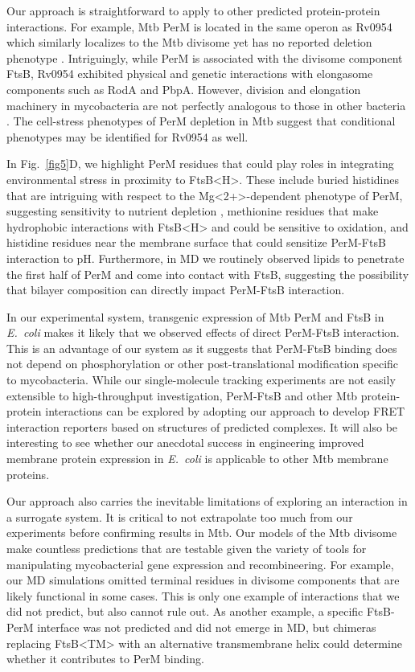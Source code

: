 \documentclass[twocolumn,pdflatex,sn-nature]{sn-jnl}%
\def\textsuperscript#1{<#1>}%
\newcommand\ec{\textit{E.~coli}}
\newcommand\mtb{Mtb}
\newcommand\ftsbTM{FtsB\textsuperscript{TM}}
\newcommand\ftsbH{FtsB\textsuperscript{H}}
\begin{document}
Our approach is straightforward to apply to other predicted protein-protein interactions.
For example, \mtb{} PerM is located in the same operon as Rv0954 which similarly localizes to the \mtb{} divisome yet has no reported deletion phenotype \citep{wangRv0954MemberMycobacterial2021a}.
Intriguingly, while PerM is associated with the divisome component FtsB, Rv0954 exhibited physical and genetic interactions with elongasome components such as RodA and PbpA.
However, division and elongation machinery in mycobacteria are not perfectly analogous to those in other bacteria \cite{baranowskiDreamMycobacterium2019}.
The cell-stress phenotypes of PerM depletion in \mtb{} suggest that conditional phenotypes may be identified for Rv0954 as well.

In Fig.~\ref{fig5}D, we highlight PerM residues that could play roles in integrating environmental stress in proximity to \ftsbH{}.
These include buried histidines that are intriguing with respect to the Mg\textsuperscript{2+}-dependent phenotype of PerM, suggesting sensitivity to nutrient depletion \citep{goodsmithDisruptionTuberculosisMembrane2015}, methionine residues that make hydrophobic interactions with \ftsbH{} and could be sensitive to oxidation, and histidine residues near the membrane surface that could sensitize PerM-FtsB interaction to pH.
Furthermore, in MD we routinely observed lipids to penetrate the first half of PerM and come into contact with FtsB, suggesting the possibility that bilayer composition can directly impact PerM-FtsB interaction.

In our experimental system, transgenic expression of \mtb{} PerM and FtsB in \ec{} makes it likely that we observed effects of direct PerM-FtsB interaction.
This is an advantage of our system as it suggests that PerM-FtsB binding does not depend on phosphorylation or other post-translational modification specific to mycobacteria.
While our single-molecule tracking experiments are not easily extensible to high-throughput investigation, PerM-FtsB and other \mtb{} protein-protein interactions can be explored by adopting our approach to develop FRET interaction reporters based on structures of predicted complexes.
It will also be interesting to see whether our anecdotal success in engineering improved membrane protein expression in \ec{} is applicable to other \mtb{} membrane proteins.

Our approach also carries the inevitable limitations of exploring an interaction in a surrogate system.
It is critical to not extrapolate too much from our experiments before confirming results in \mtb{}.
Our models of the \mtb{} divisome make countless predictions that are testable given the variety of tools for manipulating mycobacterial gene expression and recombineering.
For example, our MD simulations omitted terminal residues in divisome components that are likely functional in some cases.
This is only one example of interactions that we did not predict, but also cannot rule out.
As another example, a specific FtsB-PerM interface was not predicted and did not emerge in MD, but chimeras replacing \ftsbTM{} with an alternative transmembrane helix could determine whether it contributes to PerM binding.
\end{document}
